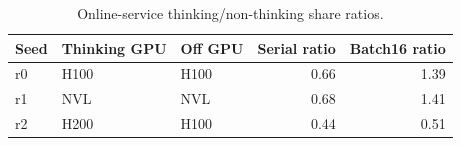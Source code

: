 
\begin{table}[t]
\caption{Online-service thinking/non-thinking share ratios.}
\label{tab:service-h2}
\centering\small
\begin{tabular}{lllrr}
\toprule
Seed & Thinking GPU & Off GPU & Serial ratio & Batch16 ratio \\
\midrule
r0 & H100 & H100 & 0.66 & 1.39 \\
r1 & NVL & NVL & 0.68 & 1.41 \\
r2 & H200 & H100 & 0.44 & 0.51 \\
\bottomrule
\end{tabular}
\end{table}
